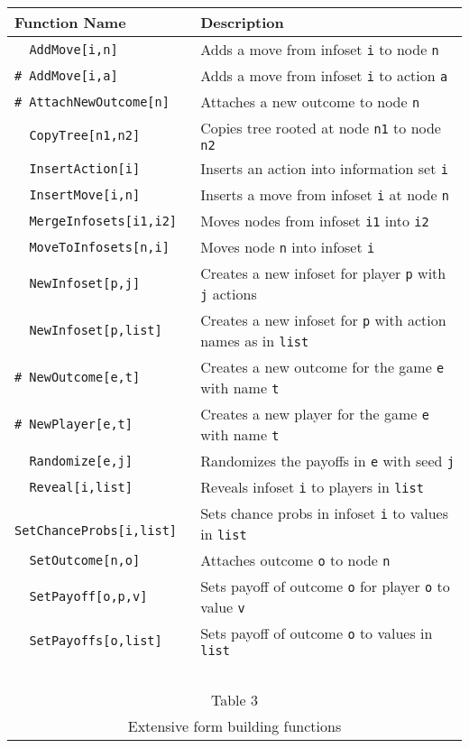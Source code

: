 \begin{table}[htp]
\begin{center}
\begin{tabular} {|l||l|} \hline
Function Name	& Description \\ 
\hline
\verb+  AddMove[i,n]+ &Adds a move from infoset \verb+i+ to node \verb+n+ \\
\verb+# AddMove[i,a]+ &Adds a move from infoset \verb+i+ to action \verb+a+ \\
\verb+# AttachNewOutcome[n]+ &Attaches a new outcome to node \verb+n+ \\
\verb+  CopyTree[n1,n2]+ &Copies tree rooted at node \verb+n1+ to node \verb+n2+ \\
\verb+  InsertAction[i]+ &Inserts an action into information set \verb+i+ \\
\verb+  InsertMove[i,n]+ &Inserts a move from infoset \verb+i+ at node \verb+n+\\
\verb+  MergeInfosets[i1,i2]+ &Moves nodes from infoset \verb+i1+ into \verb+i2+\\
\verb+  MoveToInfosets[n,i]+ &Moves node \verb+n+ into infoset \verb+i+\\
\verb+  NewInfoset[p,j]+ &Creates a new infoset for player \verb+p+ with \verb+j+ actions\\
\verb+  NewInfoset[p,list]+ &Creates a new infoset for \verb+p+ with action names as in \verb+list+\\
\verb+# NewOutcome[e,t]+ &Creates a new outcome for the game \verb+e+
with name \verb+t+\\
\verb+# NewPlayer[e,t]+ &Creates a new player for the game \verb+e+
with name \verb+t+\\
\verb+  Randomize[e,j]+ &Randomizes the payoffs in \verb+e+ with seed \verb+j+\\
\verb+  Reveal[i,list]+ &Reveals infoset \verb+i+ to players in \verb+list+\\
\verb+  SetChanceProbs[i,list]+ &Sets chance probs in infoset \verb+i+ to values in \verb+list+\\
\verb+  SetOutcome[n,o]+ &Attaches outcome \verb+o+ to node \verb+n+ \\
\verb+  SetPayoff[o,p,v]+ &Sets payoff of outcome \verb+o+ for player \verb+o+ to value \verb+v+\\
\verb+  SetPayoffs[o,list]+ &Sets payoff of outcome \verb+o+ to values in \verb+list+\\
\hline
\multicolumn{2}{c}{\ }\\
\multicolumn{2}{c}{Table 3}\\
\multicolumn{2}{c}{Extensive form building functions}\\
\end{tabular}
\end{center}
\end{table}
\medskip

